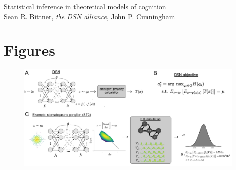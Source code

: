 \documentclass[11pt]{article}
\begin{document}
\medskip                        %

\thispagestyle{plain}
{\Large Statistical inference in theoretical models of cognition} \\
Sean R. Bittner, \textit{the DSN alliance}, John P. Cunningham

\section{Figures}
\clearpage

\begin{figure}
\begin{center}
\includegraphics[scale=0.3]{figs/Fig1.pdf}
\end{center}
\caption{}
\end{figure}

\clearpage
\end{document}
